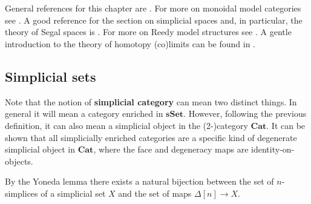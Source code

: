 \chapter{}\label{chapter:model_theory}

    General references for this chapter are \cite{riehl_model, hovey}. For more on monoidal model categories see \cite{riehl_monoidal}. A good reference for the section on simplicial spaces and, in particular, the theory of Segal spaces is \cite{rezk}. For more on Reedy model structures see \cite{riehl_verity_reedy}. A gentle introduction to the theory of homotopy (co)limits can be found in \cite{lambrechts, hocolim_riehl}.

\section{Simplicial sets}

    \begin{remark}
        Note that the notion of \textbf{simplicial category} can mean two distinct things. In general it will mean a category enriched in $\mathbf{sSet}$. However, following the previous definition, it can also mean a simplicial object in the (2-)category $\mathbf{Cat}$. It can be shown that all simplicially enriched categories are a specific kind of degenerate simplicial object in $\mathbf{Cat}$, where the face and degeneracy maps are identity-on-objects.
    \end{remark}

    \begin{property}
        By the Yoneda lemma there exists a natural bijection between the set of $n$-simplices of a simplicial set $X$ and the set of maps $\Delta[n]\rightarrow X$.
    \end{property}

